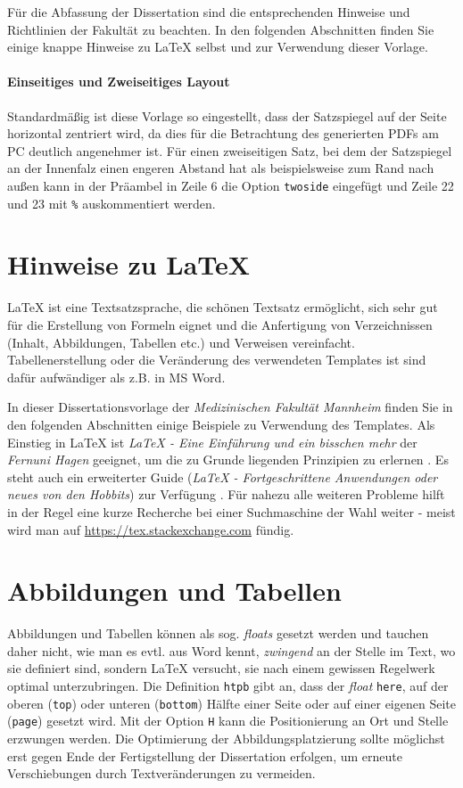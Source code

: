 \documentclass{scrreprt}
\begin{document}
Für die Abfassung der Dissertation sind die entsprechenden Hinweise und Richtlinien der Fakultät zu beachten. In den folgenden Abschnitten finden Sie einige knappe Hinweise zu LaTeX selbst und zur Verwendung dieser Vorlage. 

\paragraph{Einseitiges und Zweiseitiges Layout}
Standardmäßig ist diese Vorlage so eingestellt, dass der Satzspiegel auf der Seite horizontal zentriert wird, da dies für die Betrachtung des generierten PDFs am PC deutlich angenehmer ist. Für einen zweiseitigen Satz, bei dem der Satzspiegel an der Innenfalz einen engeren Abstand hat als beispielsweise zum Rand nach außen kann in der Präambel in Zeile 6 die Option \verb|twoside| eingefügt und Zeile 22 und 23 mit \verb|%| auskommentiert werden. 

\section{Hinweise zu \LaTeX}
\par{\LaTeX} ist eine Textsatzsprache, die schönen Textsatz ermöglicht, sich sehr gut für die Erstellung von Formeln eignet und die Anfertigung von Verzeichnissen (Inhalt, Abbildungen, Tabellen etc.) und Verweisen vereinfacht. Tabellenerstellung oder die Veränderung des verwendeten Templates ist sind dafür aufwändiger als z.B. in MS Word. 

In dieser Dissertationsvorlage der \textit{Medizinischen Fakultät Mannheim} finden Sie in den folgenden Abschnitten einige Beispiele zu Verwendung des Templates. Als Einstieg in LaTeX  ist  \textit{LaTeX - Eine Einführung und ein bisschen mehr} der \textit{Fernuni Hagen} geeignet, um die zu Grunde liegenden Prinzipien zu erlernen \cite{LaTeX_Guide_1}. Es steht auch ein erweiterter Guide (\textit{LaTeX - Fortgeschrittene Anwendungen oder neues von den Hobbits}) zur Verfügung \cite{LaTeX_Guide_2}. Für nahezu alle weiteren Probleme hilft in der Regel eine kurze Recherche bei einer Suchmaschine der Wahl weiter - meist wird man auf \url{https://tex.stackexchange.com} fündig. 

\section{Abbildungen und Tabellen}

Abbildungen und Tabellen können als sog. \textit{floats} gesetzt werden und tauchen daher nicht, wie man es evtl. aus Word kennt, \textit{zwingend} an der Stelle im Text, wo sie definiert sind, sondern LaTeX versucht, sie nach einem gewissen Regelwerk optimal unterzubringen. Die Definition \verb|htpb| gibt an, dass der \textit{float} \verb|here|, auf der oberen (\verb|top|) oder unteren (\verb|bottom|) Hälfte einer Seite oder auf einer eigenen Seite (\verb|page|) gesetzt wird. Mit der Option \verb|H| kann die Positionierung an Ort und Stelle erzwungen werden. Die Optimierung der Abbildungsplatzierung sollte möglichst erst gegen Ende der Fertigstellung der Dissertation erfolgen, um erneute Verschiebungen durch Textveränderungen zu vermeiden. 
\end{document}
